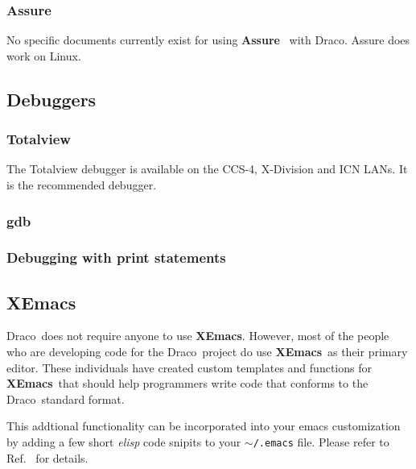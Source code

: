 \documentclass[11pt]{nmemo}
\newcommand{\comp}[1]{\normalfont\footnotesize\texttt{#1}\normalsize}
\newcommand{\draco}{{\normalfont\sffamily Draco}}
\newcommand{\xemacs}{{\normalfont\bfseries XEmacs}}
\newcommand{\bash}{{\normalfont\bfseries Bash}}
\begin{document}
\subsubsection{Assure}

No specific documents currently exist for using
\textbf{Assure}~\cite{assure} with \draco.  Assure does work on Linux.


\subsection{Debuggers}

\subsubsection{Totalview}

The Totalview debugger is available on the CCS-4, X-Division and ICN
LANs.  It is the recommended debugger.

\subsubsection{gdb}

\subsubsection{Debugging with print statements}

\subsection{\xemacs}

\draco\ does not require anyone to use \xemacs.  However, most of the
people who are developing code for the \draco\ project do use \xemacs\ 
as their primary editor.  These individuals have created custom
templates and functions for \xemacs\ that should help programmers
write code that conforms to the \draco\ standard format.

This addtional functionality can be incorporated into your emacs
customization by adding a few short \emph{elisp} code snipits to your
\comp{$\sim$/.emacs} file.  Please refer to Ref.~\cite{xtm:9909} for
details.

\end{document}
